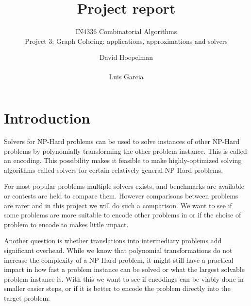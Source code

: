 \documentclass{sig-alternate}
\begin{document}
\title{Project report}

\subtitle{IN4336 Combinatorial Algorithms\\Project 3: Graph Coloring: applications, approximations and
solvers}


\author{
\alignauthor
David Hoepelman\\
       \\
\alignauthor
Luis Garcia\\
}

\maketitle


\begin{abstract}

\end{abstract}


\section{Introduction}

Solvers for NP-Hard problems can be used to solve instances of other NP-Hard problems by polynomially transforming the other problem instance. This is called an encoding.
This possibility makes it feasible to make highly-optimized solving algorithms called solvers for certain relatively general NP-Hard problems.

For most popular problems multiple solvers exists, and benchmarks are available or contests are held to compare them.
However comparisons between problems are rarer and in this project we will do such a comparison.
We want to see if some problems are more suitable to encode other problems in or if the choise of problem to encode to makes little impact.

Another question is whether translations into intermediary problems add significant overhead.
While we know that polynomial transformations do not increase the complexity of a NP-Hard problem, it might still have a practical impact in how fast a problem instance can be solved or what the largest solvable problem instance is.
With this we want to see if encodings can be viably done in smaller easier steps, or if it is better to encode the problem directly into the target problem.
\end{document}

